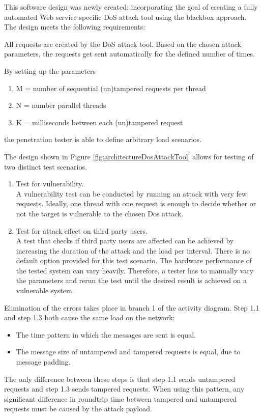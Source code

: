 This software design was newly created; incorporating the goal of creating a fully automated Web service specific DoS attack tool using the blackbox approach. 
The design meets the following requirements:

\label{sec:ImpAutomatedSending}
All requests are created by the DoS attack tool.
Based on the chosen attack parameters, the requests get sent automatically for the defined number of times. 

\label{sec:ImpLoadScenario}
By setting up the parameters 
\begin{enumerate}
  \item M = number of sequential (un)tampered requests per thread 
  \item N = number parallel threads 
  \item K = milliseconds between each (un)tampered request
\end{enumerate}
the penetration tester is able to define arbitrary load scenarios. 

\label{sec:ImpTestScenarios}
The design shown in Figure \ref{fig:architectureDosAttackTool} allows for testing of two distinct test scenarios. 
\begin{enumerate}
  \item Test for vulnerability.\\
  A vulnerability test can be conducted by running an attack with very few requests.
  Ideally, one thread with one request is enough to decide whether or not the target is vulnerable to the chosen Dos attack.
  
  \item Test for attack effect on third party users.\\
  A test that checks if third party users are affected can be achieved by increasing the duration of the attack and the load per interval. 
  There is no default option provided for this test scenario. The hardware performance of the tested system can vary heavily. 
  Therefore, a tester has to manually vary the parameters and rerun the test until the desired result is achieved on a vulnerable system.\\
\end{enumerate}

\label{sec:ImpErrors}
Elimination of the errors takes place in branch 1 of the activity diagram. 
Step 1.1 and step 1.3 both cause the same load on the network:
\begin{itemize}
 \item The time pattern in which the messages are sent is equal.
 \item The message size of untampered and tampered requests is equal, due to message padding.
\end{itemize}
The only difference between these steps is that step 1.1 sends untampered requests and step 1.3 sends tampered requests.  
When using this pattern, any significant difference in roundtrip time between tampered and untampered requests must be caused by the attack payload.\\

